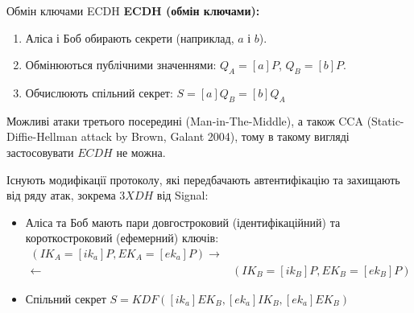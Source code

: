 \documentclass[9pt]{beamer}
\begin{document}
\begin{darkframes}
\begin{frame}{Обмін ключами ECDH}
  \textbf{ECDH (обмін ключами):}
  \begin{enumerate}
    \item Аліса і Боб обирають секрети (наприклад, \(a\) і \(b\)).
    \item Обмінюються публічними значеннями: \(Q_A = [a]P\), \(Q_B = [b]P\).
    \item Обчислюють спільний секрет: \(S = [a]Q_B = [b]Q_A\)
  \end{enumerate}
    Можливі атаки третього посередині (Man-in-The-Middle), а також CCA (Static-Diffie-Hellman attack by Brown, Galant 2004), тому в такому вигляді застосовувати $ECDH$ не можна. 
    
    Існують модифікації протоколу, які передбачають автентифікацію та захищають від ряду атак, зокрема $3XDH$ від Signal:
    \begin{itemize}
        \item Аліса та Боб мають пари довгостроковий (ідентифікаційний) та короткостроковий (ефемерний) ключів: \begin{align*}
            (IK_A=[ik_a]P, EK_A=[ek_a]P) \rightarrow \\
            \leftarrow & (IK_B=[ik_B]P, EK_B=[ek_B]P)
        \end{align*}
        \item Спільний секрет $S=KDF([ik_a]EK_B, [ek_a]IK_B, [ek_a]EK_B)$
    \end{itemize}
\end{frame}


\end{darkframes}
\end{document}
